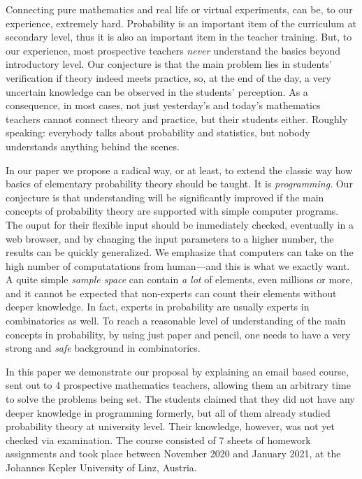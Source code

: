 \documentclass[]{interact}
\theoremstyle{plain}%
\theoremstyle{definition}
\theoremstyle{remark}
\begin{document}
Connecting pure mathematics and real life or virtual experiments, can be, to our experience,
extremely hard. Probability is an important item of the curriculum at secondary level,
thus it is also an important item in the teacher training. But, to our experience,
most prospective teachers \textit{never} understand the basics beyond introductory level.
Our conjecture is that the main problem lies in students' verification if theory indeed meets practice,
so, at the end of the day, a very uncertain knowledge can be observed in the students' perception. As a consequence,
in most cases, not just yesterday's and today's mathematics teachers cannot connect
theory and practice, but their students either. Roughly speaking: everybody talks about probability and
statistics, but nobody understands anything behind the scenes.

In our paper we propose a radical way, or at least, to extend the classic way how
basics of elementary probability theory should be taught. It is \textit{programming}.
Our conjecture is that understanding will be significantly improved if the main concepts
of probability theory are supported with simple computer programs. The ouput for their flexible input
should be immediately checked, eventually in a web browser, and by changing the input parameters
to a higher number, the results can be quickly generalized. We emphasize that computers
can take on the high number of computatations from human---and this is what we exactly want.
A quite simple \textit{sample space} can contain \textit{a lot} of elements, even millions or more, and it cannot
be expected that non-experts can count their elements without deeper knowledge. In fact,
experts in probability are usually experts in combinatorics as well. To reach a reasonable
level of understanding of the main concepts in probability, by using just paper and pencil,
one needs to have a very strong and \textit{safe} background in combinatorics.

In this paper we demonstrate our proposal by explaining an email based course, sent out
to 4 prospective mathematics teachers, allowing them an arbitrary time to solve the problems being set.
The students claimed that they did not have any deeper knowledge in programming formerly, but all of
them already studied probability theory at university level. Their knowledge, however, was
not yet checked via examination. The course consisted of 7 sheets of homework assignments
and took place between November 2020 and January 2021, at the Johannes Kepler University of Linz, Austria.
\end{document}
